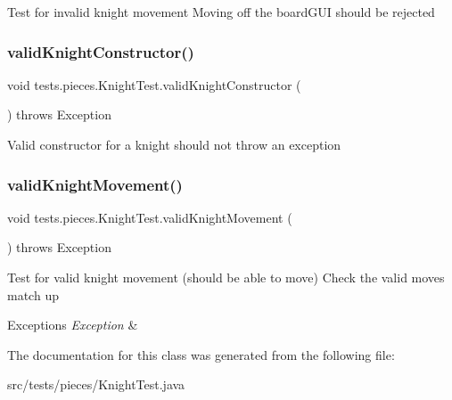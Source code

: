 Test for invalid knight movement Moving off the board\+G\+UI should be rejected \hypertarget{classtests_1_1pieces_1_1_knight_test_ac63e8a47040357e6f02594034d0ecb75}{}\label{classtests_1_1pieces_1_1_knight_test_ac63e8a47040357e6f02594034d0ecb75} 
\subsubsection{\texorpdfstring{valid\+Knight\+Constructor()}{validKnightConstructor()}}
{\footnotesize\ttfamily void tests.\+pieces.\+Knight\+Test.\+valid\+Knight\+Constructor (\begin{DoxyParamCaption}{ }\end{DoxyParamCaption}) throws Exception}

Valid constructor for a knight should not throw an exception \hypertarget{classtests_1_1pieces_1_1_knight_test_a1f441301e64a3dd8330a3646fcb25c0b}{}\label{classtests_1_1pieces_1_1_knight_test_a1f441301e64a3dd8330a3646fcb25c0b} 
\subsubsection{\texorpdfstring{valid\+Knight\+Movement()}{validKnightMovement()}}
{\footnotesize\ttfamily void tests.\+pieces.\+Knight\+Test.\+valid\+Knight\+Movement (\begin{DoxyParamCaption}{ }\end{DoxyParamCaption}) throws Exception}

Test for valid knight movement (should be able to move) Check the valid moves match up 
\begin{DoxyExceptions}{Exceptions}
{\em Exception} & \\
\hline
\end{DoxyExceptions}


The documentation for this class was generated from the following file\+:\begin{DoxyCompactItemize}
\item 
src/tests/pieces/Knight\+Test.\+java\end{DoxyCompactItemize}
